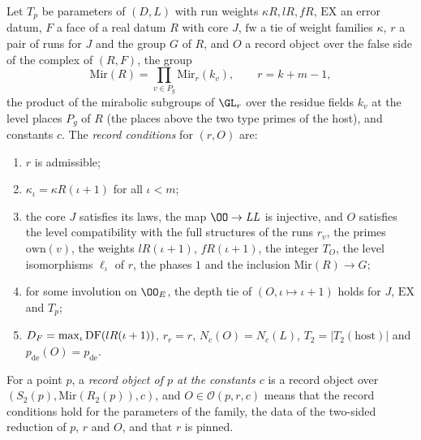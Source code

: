 \begin{definition}\label{pf:onto3:isrec}
Let $T_p$ be parameters of $(D,L)$ with run weights $\kappa R,lR,fR$, $\mathrm{EX}$ an error datum, $F$ a face of a real
datum $R$ with core $J$, $\mathrm{fw}$ a tie of weight families $\kappa$, $r$ a pair of runs for $J$ and the group $G$ of
$R$, and $O$ a record object over the false side of the complex of $(R,F)$, the group
\begin{equation}\label{eq:pf:onto3:Mir}
\mathrm{Mir}(R)=\prod_{v\in P_g}\mathrm{Mir}_{r}(k_v),\qquad r=k+m-1,
\end{equation}
the product of the mirabolic subgroups of $\GL_r$ over the residue fields $k_v$ at the level places $P_g$ of $R$ (the
places above the two type primes of the host), and constants $c$. The \emph{record
conditions} for $(r,O)$ are:
\begin{enumerate}[label=(\roman*)]
\item $r$ is admissible;
\item $\kappa_\iota=\kappa R(\iota+1)$ for all $\iota<m$;
\item the core $J$ satisfies its laws, the map $\OO\to\mathit{LL}$ is injective, and $O$ satisfies the level compatibility
with the full structures of the runs $r_v$, the primes $\mathrm{own}(v)$, the weights $lR(\iota+1)$, $fR(\iota+1)$, the
integer $T_O$, the level isomorphisms $\ell_\iota$ of $r$, the phases $1$ and the inclusion $\mathrm{Mir}(R)\to G$;
\item for some involution on $\OO_E$, the depth tie of $(O,\iota\mapsto\iota+1)$ holds for $J$, $\mathrm{EX}$ and $T_p$;
\item $D_F=\max_\iota\operatorname{DF}(lR(\iota+1))$, $r_r=r$, $N_c(O)=N_c(L)$, $T_2=|T_2(\mathrm{host})|$ and
$p_{\mathrm{de}}(O)=p_{\mathrm{de}}$.
\end{enumerate}
For a point $p$, a \emph{record object of $p$ at the constants $c$} is a record object over
$(S_2(p),\mathrm{Mir}(R_2(p)),c)$, and $O\in\mathcal O(p,r,c)$ means that the record conditions hold for the parameters of
the family, the data of the two-sided reduction of $p$, $r$ and $O$, and that $r$ is pinned.
\end{definition}

